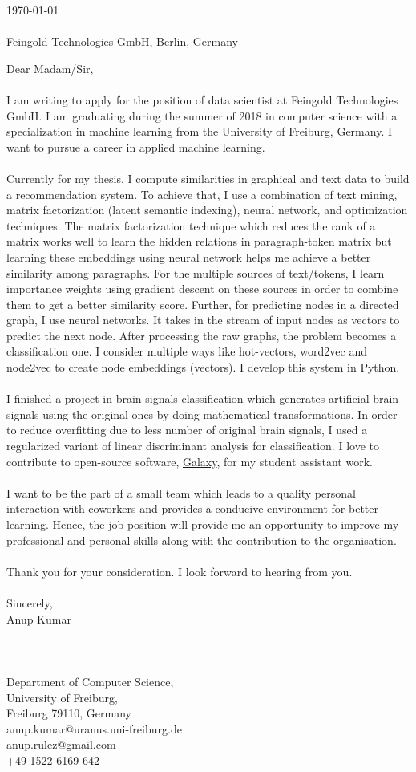 \documentclass[a4paper]{article}
\begin{document}
\today \\
\\
Feingold Technologies GmbH, \newline
Berlin, \newline
Germany \newline

Dear Madam/Sir,
\\
\\
I am writing to apply for the position of data scientist at Feingold Technologies GmbH. I am graduating during the summer of 2018 in computer science with a specialization in machine learning from the University of Freiburg, Germany. I want to pursue a career in applied machine learning.
\\
\\
Currently for my thesis, I compute similarities in graphical and text data to build a recommendation system. To achieve that, I use a combination of text mining, matrix factorization (latent semantic indexing), neural network, and optimization techniques. The matrix factorization technique which reduces the rank of a matrix works well to learn the hidden relations in paragraph-token matrix but learning these embeddings using neural network helps me achieve a better similarity among paragraphs. For the multiple sources of text/tokens, I learn importance weights using gradient descent on these sources in order to combine them to get a better similarity score. Further, for predicting nodes in a directed graph, I use neural networks. It takes in the stream of input nodes as vectors to predict the next node. After processing the raw graphs, the problem becomes a classification one. I consider multiple ways like hot-vectors, word2vec and node2vec to create node embeddings (vectors). I develop this system in Python.
\\
\\
I finished a project in brain-signals classification which generates artificial brain signals using the original ones by doing mathematical transformations. In order to reduce overfitting due to less number of original brain signals, I used a regularized variant of linear discriminant analysis for classification. I love to contribute to open-source software, 
\href{https://usegalaxy.org/} {Galaxy}, for my student assistant work.
\\
\\
I want to be the part of a small team which leads to a quality personal interaction with coworkers and provides a conducive environment for better learning. Hence, the job position will provide me an opportunity to improve my professional and personal skills along with the contribution to the organisation.
\\
\\
Thank you for your consideration. I look forward to hearing from you.
\\
\\
Sincerely, \\
Anup Kumar \newline
\\
\\
\\
\\
Department of Computer Science, \\
University of Freiburg, \\
Freiburg 79110, Germany \\
anup.kumar@uranus.uni-freiburg.de\\
anup.rulez@gmail.com\\
+49-1522-6169-642\\
\end{document}
